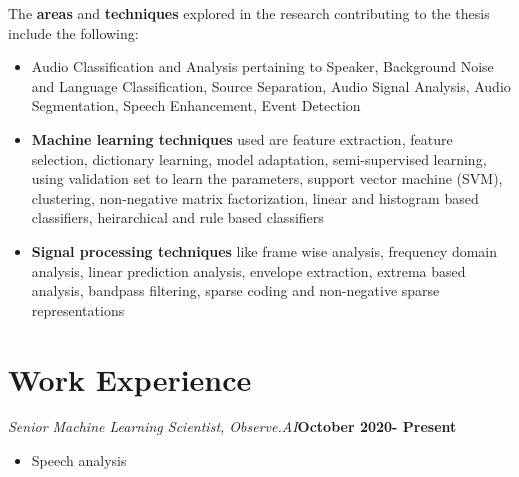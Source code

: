 \documentclass[line]{resume}
\begin{document}
{\begin{resume}
			
			The \textbf{areas} and \textbf{techniques} explored in the research contributing to the thesis include the following:
			
			\vspace{-3.5mm}
			\begin{itemize}
				\item Audio Classification and Analysis pertaining to Speaker, Background Noise and Language Classification, Source Separation, Audio Signal Analysis, Audio Segmentation, Speech Enhancement, Event Detection 
				\item  \textbf{Machine learning techniques} used are feature extraction, feature selection, dictionary learning, model adaptation, semi-supervised learning, using validation set to learn the parameters, support vector machine (SVM), clustering, non-negative matrix factorization, linear and histogram based classifiers, heirarchical  and rule based classifiers
				
				\item \textbf{Signal processing techniques} like frame wise analysis, frequency domain analysis, linear prediction analysis, envelope extraction, extrema based analysis, bandpass filtering, sparse coding and non-negative sparse representations
			\end{itemize}
			
			\section{\mysidestyle Work Experience}
		
			\begin{list2}

			\item \emph{Senior Machine Learning Scientist, Observe.AI}\hfill \textbf{October 2020- Present}
			\begin{itemize}
				\item Speech analysis
			\end{itemize}


\end{list2}
\end{resume}}
\end{document}
